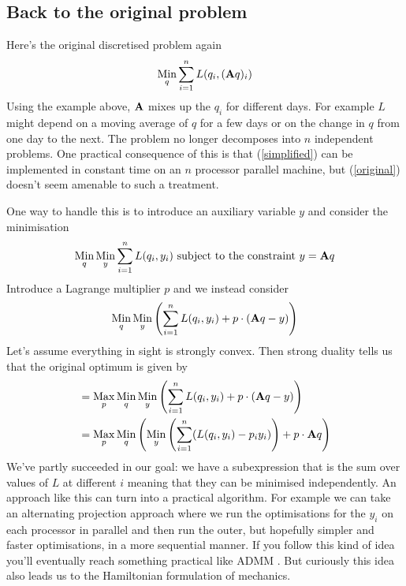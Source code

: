 \documentclass{article}
\begin{document}
\subsection{Back to the original problem}
Here's the original discretised problem again
\begin{equation}
\mathop{\mathrm{Min}}_q\sum_{i=1}^nL(q_i,(\mathbf{A} q)_i)
\end{equation}
Using the example above, $\mathbf{A}$ mixes up the $q_i$ for different days.
For example $L$ might depend on a moving average of $q$ for a few days or on the change in $q$ from one day to the next.
The problem no longer decomposes into $n$ independent problems.
One practical consequence of this is that (\ref{simplified}) can be implemented in constant time on an $n$ processor parallel machine, but (\ref{original}) doesn't seem amenable to such a treatment.

One way to handle this is to introduce an auxiliary variable $y$ and consider
the minimisation
\[
\mathop{\mathrm{Min}}_q\mathop{\mathrm{Min}}_y\sum_{i=1}^nL(q_i,y_i)\mbox{ subject to the constraint }y=\mathbf{A} q
\]
Introduce a Lagrange multiplier $p$ and we instead consider
\[
\mathop{\mathrm{Min}}_q\mathop{\mathrm{Min}}_y\left(\sum_{i=1}^nL(q_i,y_i)+p\cdot(\mathbf{A} q-y)\right)
\]
Let's assume everything in sight is strongly convex.
Then strong duality tells us that the original optimum is given by
\begin{align*}
&=\mathop{\mathrm{Max}}_p\mathop{\mathrm{Min}}_q\mathop{\mathrm{Min}}_y\left(\sum_{i=1}^nL(q_i,y_i)+p\cdot(\mathbf{A} q-y)\right)\\
&=\mathop{\mathrm{Max}}_p\mathop{\mathrm{Min}}_q\left(\mathop{\mathrm{Min}}_y\left(\sum_{i=1}^n(L(q_i,y_i)-p_iy_i)\right)+p\cdot\mathbf{A} q\right)\\
\end{align*}
We've partly succeeded in our goal: we have a subexpression that is the sum over values of $L$ at different $i$ meaning that they can be minimised independently.
An approach like this can turn into a practical algorithm.
For example we can take an alternating projection approach where we run the optimisations for the $y_i$ on each processor in parallel and then run the outer, but hopefully simpler and faster optimisations, in a more sequential manner.
If you follow this kind of idea you'll eventually reach something practical like ADMM \cite{boyd}. But curiously this idea also leads us to the Hamiltonian formulation of mechanics.
\end{document}
